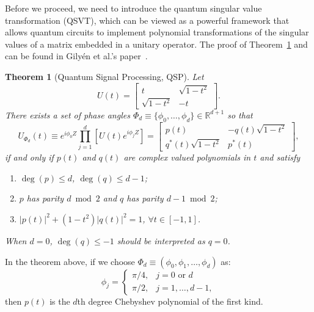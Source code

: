 \documentclass{article}
\newtheorem{theorem}{Theorem}[section]
\begin{document}
Before we proceed, we need to introduce the quantum singular value transformation (QSVT), which can be viewed as a powerful framework that allows quantum circuits to implement polynomial transformations of the singular values of a matrix embedded in a unitary operator.
The proof of Theorem~\ref{thm:qsp} and can be found in Gilyén et al.'s paper~\cite{Gilyen2019}.

\begin{theorem}[Quantum Signal Processing, QSP]
  \label{thm:qsp}
  Let
  \begin{equation}
    U(t) =
    \begin{bmatrix}
      t              & \sqrt{1 - t^2} \\
      \sqrt{1 - t^2} & -t
    \end{bmatrix}.\label{eq:equation15}
  \end{equation}
  There exists a set of phase angles $\Phi_d \equiv \{\phi_0, \ldots, \phi_d\} \in \mathbb{R}^{d+1}$ so that
  \begin{equation}
    U_{\Phi_d}(t) \equiv e^{i\phi_0 Z} \prod_{j=1}^d \left[ U(t) e^{i\phi_j Z} \right] =
    \begin{bmatrix}
      p(t)                 & -q(t)\sqrt{1 - t^2} \\
      q^*(t)\sqrt{1 - t^2} & p^*(t)
    \end{bmatrix},\label{eq:equation16}
  \end{equation}
  if and only if $p(t)$ and $q(t)$ are complex valued polynomials in $t$ and satisfy
  \begin{enumerate}
    \item $\deg(p) \leq d$, $\deg(q) \leq d - 1$;
    \item $p$ has parity $d \bmod 2$ and $q$ has parity $d - 1 \bmod 2$;
    \item $|p(t)|^2 + (1 - t^2)|q(t)|^2 = 1$, $\forall t \in [-1, 1]$.
  \end{enumerate}
  When $d = 0$, $\deg(q) \leq -1$ should be interpreted as $q = 0$.

\end{theorem}

In the theorem above, if we choose $\Phi_d \equiv (\phi_0, \phi_1, \ldots, \phi_d)$ as:
\begin{equation}
  \phi_j =
  \begin{cases}
    \pi/4, & j = 0 \text{ or } d \\
    \pi/2, & j = 1, \ldots, d-1,
  \end{cases}
\end{equation}
then $p(t)$ is the $d$th degree Chebyshev polynomial of the first kind.
\end{document}
